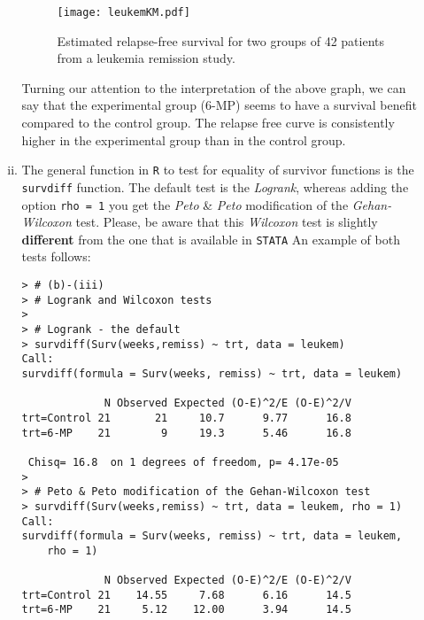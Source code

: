 \begin{enumerate}[(a)]
\begin{enumerate}[(i)]
\begin{figure}[htbp]
	\centering
		\texttt{[image: leukemKM.pdf]}
	\caption{Estimated relapse-free survival for two groups of 42 patients from a leukemia remission study.}
	\label{figure1}
\end{figure}
Turning our attention to the interpretation of the above graph, we can say that the experimental group (6-MP) seems to have a survival benefit compared to the control group. The
relapse free curve is consistently higher in the experimental group than in the control group.
\item The general function in \verb|R| to test for equality of survivor functions is the \verb|survdiff| function. The default test is the \emph{Logrank}, whereas adding the option \verb|rho = 1| you get the \emph{Peto} \& \emph{Peto} modification of the \emph{Gehan-Wilcoxon} test. Please, be aware that this \emph{Wilcoxon} test is slightly \textbf{different} from the one that is available in \verb|STATA| 
An example of both tests
follows:
\begin{footnotesize}
\begin{verbatim}
> # (b)-(iii)
> # Logrank and Wilcoxon tests
> 
> # Logrank - the default
> survdiff(Surv(weeks,remiss) ~ trt, data = leukem)
Call:
survdiff(formula = Surv(weeks, remiss) ~ trt, data = leukem)

             N Observed Expected (O-E)^2/E (O-E)^2/V
trt=Control 21       21     10.7      9.77      16.8
trt=6-MP    21        9     19.3      5.46      16.8

 Chisq= 16.8  on 1 degrees of freedom, p= 4.17e-05 
> 
> # Peto & Peto modification of the Gehan-Wilcoxon test
> survdiff(Surv(weeks,remiss) ~ trt, data = leukem, rho = 1)
Call:
survdiff(formula = Surv(weeks, remiss) ~ trt, data = leukem, 
    rho = 1)

             N Observed Expected (O-E)^2/E (O-E)^2/V
trt=Control 21    14.55     7.68      6.16      14.5
trt=6-MP    21     5.12    12.00      3.94      14.5


\end{verbatim}
\end{footnotesize}
\end{enumerate}
\end{enumerate}
